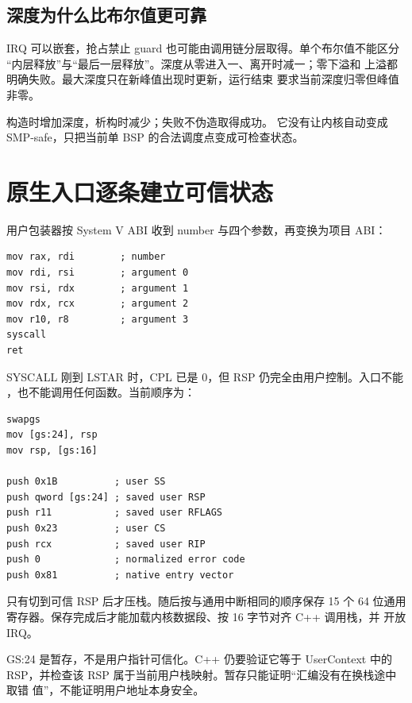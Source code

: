 \subsection{深度为什么比布尔值更可靠}

IRQ 可以嵌套，抢占禁止 guard 也可能由调用链分层取得。单个布尔值不能区分
“内层释放”与“最后一层释放”。深度从零进入一、离开时减一；零下溢和
 上溢都明确失败。最大深度只在新峰值出现时更新，运行结束
要求当前深度归零但峰值非零。

 构造时增加深度，析构时减少；失败不伪造取得成功。
它没有让内核自动变成 SMP-safe，只把当前单 BSP 的合法调度点变成可检查状态。

\section{原生入口逐条建立可信状态}

用户包装器按 System V ABI 收到 number 与四个参数，再变换为项目 ABI：

\begin{lstlisting}[language={[x86masm]Assembler},caption={用户侧最小原生包装}]
mov rax, rdi        ; number
mov rdi, rsi        ; argument 0
mov rsi, rdx        ; argument 1
mov rdx, rcx        ; argument 2
mov r10, r8         ; argument 3
syscall
ret
\end{lstlisting}

SYSCALL 刚到 LSTAR 时，CPL 已是 0，但 RSP 仍完全由用户控制。入口不能
，也不能调用任何函数。当前顺序为：

\begin{lstlisting}[language={[x86masm]Assembler},caption={可信换栈的关键前缀}]
swapgs
mov [gs:24], rsp
mov rsp, [gs:16]

push 0x1B          ; user SS
push qword [gs:24] ; saved user RSP
push r11           ; saved user RFLAGS
push 0x23          ; user CS
push rcx           ; saved user RIP
push 0             ; normalized error code
push 0x81          ; native entry vector
\end{lstlisting}

只有切到可信 RSP 后才压栈。随后按与通用中断相同的顺序保存 15 个 64 位通用
寄存器。保存完成后才能加载内核数据段、按 16 字节对齐 C++ 调用栈，并
 开放 IRQ。

\begin{contractbox}
GS:24 是暂存，不是用户指针可信化。C++ 仍要验证它等于 UserContext 中的
RSP，并检查该 RSP 属于当前用户栈映射。暂存只能证明“汇编没有在换栈途中取错
值”，不能证明用户地址本身安全。
\end{contractbox}


